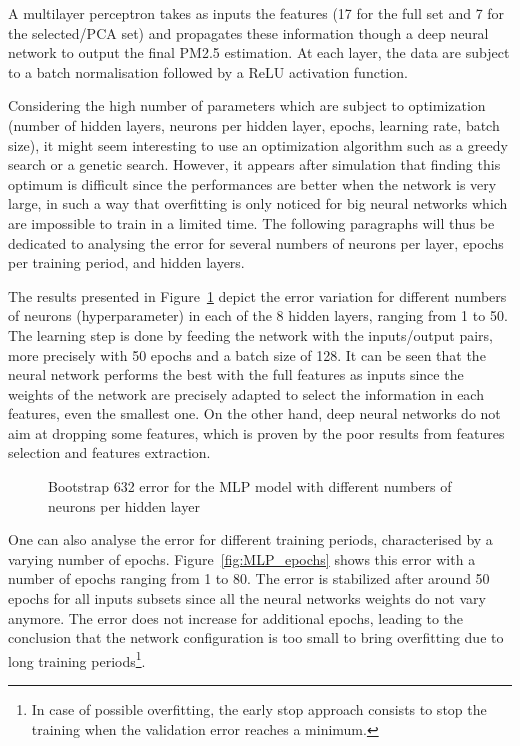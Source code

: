 \documentclass[journal,11pt]{IEEEtran}
\begin{document}
A multilayer perceptron takes as inputs the features (17 for the full set and 7 for the selected/PCA set) and propagates these information though a deep neural network to output the final PM2.5 estimation. At each layer, the data are subject to a batch normalisation followed by a ReLU activation function.

Considering the high number of parameters which are subject to optimization (number of hidden layers, neurons per hidden layer, epochs, learning rate, batch size), it might seem interesting to use an optimization algorithm such as a greedy search or a genetic search. However, it appears after simulation that finding this optimum is difficult since the performances are better when the network is very large, in such a way that overfitting is only noticed for big neural networks which are impossible to train in a limited time. The following paragraphs will thus be dedicated to analysing the error for several numbers of neurons per layer, epochs per training period, and hidden layers.

The results presented in Figure~\ref{fig:MLP} depict the error variation for different numbers of neurons (hyperparameter) in each of the 8 hidden layers, ranging from 1 to 50. The learning step is done by feeding the network with the inputs/output pairs, more precisely with 50 epochs and a batch size of 128. It can be seen that the neural network performs the best with the full features as inputs since the weights of the network are precisely adapted to select the information in each features, even the smallest one. On the other hand, deep neural networks do not aim at dropping some features, which is proven by the poor results from features selection and features extraction.

\begin{figure}[H]
    \centering
    
    \caption{Bootstrap 632 error for the MLP model with different numbers of neurons per hidden layer}
    \label{fig:MLP}
\end{figure}

One can also analyse the error for different training periods, characterised by a varying number of epochs. Figure~\ref{fig:MLP_epochs} shows this error with a number of epochs ranging from 1 to 80. The error is stabilized after around 50 epochs for all inputs subsets since all the neural networks weights do not vary anymore. The error does not increase for additional epochs, leading to the conclusion that the network configuration is too small to bring overfitting due to long training periods\footnote{In case of possible overfitting, the early stop approach consists to stop the training when the validation error reaches a minimum.}.
\end{document}
